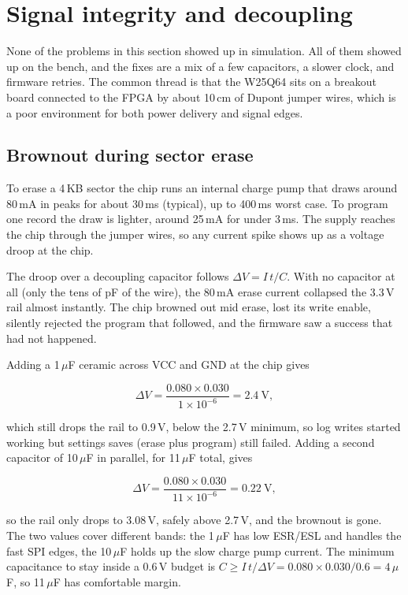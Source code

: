 \documentclass[a4paper,11pt]{article}
\begin{document}
\section{Signal integrity and decoupling}
\label{sec:si}

None of the problems in this section showed up in simulation. All of them showed up
on the bench, and the fixes are a mix of a few capacitors, a slower clock, and
firmware retries. The common thread is that the W25Q64 sits on a breakout board
connected to the FPGA by about 10\,cm of Dupont jumper wires, which is a poor
environment for both power delivery and signal edges.

\subsection{Brownout during sector erase}

To erase a 4\,KB sector the chip runs an internal charge pump that draws around
80\,mA in peaks for about 30\,ms (typical), up to 400\,ms worst case. To program one
record the draw is lighter, around 25\,mA for under 3\,ms. The supply reaches the
chip through the jumper wires, so any current spike shows up as a voltage droop at
the chip.

The droop over a decoupling capacitor follows $\Delta V = I\,t/C$. With no capacitor
at all (only the tens of pF of the wire), the 80\,mA erase current collapsed the
3.3\,V rail almost instantly. The chip browned out mid erase, lost its write enable,
silently rejected the program that followed, and the firmware saw a success that had
not happened.

Adding a 1\,$\mu$F ceramic across VCC and GND at the chip gives

\[
\Delta V = \frac{0.080 \times 0.030}{1\times 10^{-6}} = 2.4\ \mathrm{V},
\]

which still drops the rail to 0.9\,V, below the 2.7\,V minimum, so log writes started
working but settings saves (erase plus program) still failed. Adding a second
capacitor of 10\,$\mu$F in parallel, for 11\,$\mu$F total, gives

\[
\Delta V = \frac{0.080 \times 0.030}{11\times 10^{-6}} = 0.22\ \mathrm{V},
\]

so the rail only drops to 3.08\,V, safely above 2.7\,V, and the brownout is gone. The
two values cover different bands: the 1\,$\mu$F has low ESR/ESL and handles the fast
SPI edges, the 10\,$\mu$F holds up the slow charge pump current. The minimum
capacitance to stay inside a 0.6\,V budget is
$C \ge I\,t/\Delta V = 0.080\times0.030/0.6 = 4\,\mu$F, so 11\,$\mu$F has comfortable
margin.
\end{document}
